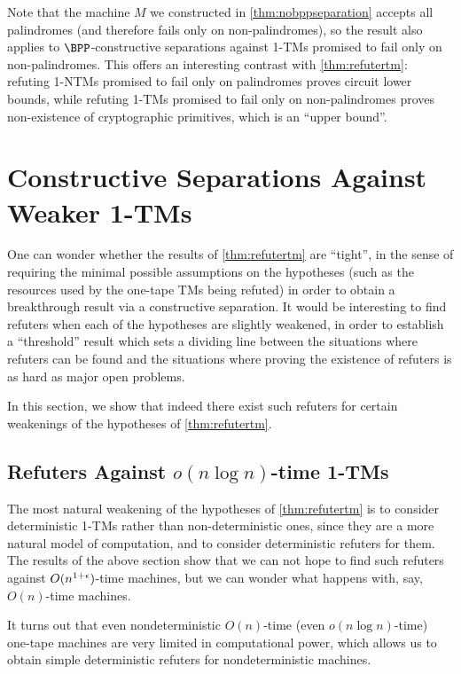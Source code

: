 Note that the machine $M$ we constructed in \cref{thm:nobppseparation} accepts all palindromes (and therefore fails only on non-palindromes), so
the result also applies to $\BPP$-constructive separations against 1-TMs promised to fail only on non-palindromes.
This offers an interesting contrast with \cref{thm:refutertm}: refuting 1-NTMs promised to fail only on palindromes proves
circuit lower bounds, while refuting 1-TMs promised to fail only on non-palindromes proves non-existence of cryptographic
primitives, which is an ``upper bound''.




\section{Constructive Separations Against Weaker 1-TMs}
\label{sec:refuteragainstweakertm}

One can wonder whether the results of \cref{thm:refutertm} are ``tight'', in the sense of requiring the minimal possible assumptions
on the hypotheses (such as the resources used by the one-tape TMs being refuted) in order to obtain a breakthrough result via a constructive
separation. It would be interesting to find refuters when each of the hypotheses are slightly weakened, in order to establish a ``threshold''
result which sets a dividing line between the situations where refuters can be found and the situations where proving the existence of
refuters is as hard as major open problems.

In this section, we show that indeed there exist such refuters for certain weakenings of the hypotheses of \cref{thm:refutertm}.

\subsection{Refuters Against $o(n \log n)$-time 1-TMs}

The most natural weakening of the hypotheses of \cref{thm:refutertm} is to consider deterministic 1-TMs rather than non-deterministic ones,
since they are a more natural model of computation, and to consider deterministic refuters for them. The results of the above 
section show that we can not hope to find such refuters against $O(n^{1+\epsilon})$-time machines, but we can wonder what happens with, say,
$O(n)$-time machines. 

It turns out that even nondeterministic $O(n)$-time (even $o(n \log n)$-time) one-tape machines are very limited in computational power,
which allows us to obtain simple deterministic refuters for nondeterministic machines. 

